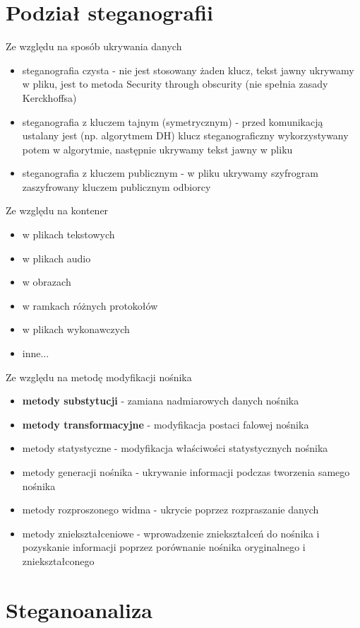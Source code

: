 \documentclass{article}
\begin{document}
\section{Podział steganografii}
Ze względu na sposób ukrywania danych
\begin{itemize}
	\item steganografia czysta - nie jest stosowany żaden klucz, tekst jawny ukrywamy w pliku, jest to metoda 	Security through obscurity (nie spełnia zasady Kerckhoffsa)
	\item steganografia z kluczem tajnym (symetrycznym) - przed komunikacją ustalany jest (np. algorytmem DH) klucz steganograficzny wykorzystywany potem w algorytmie, następnie ukrywamy tekst jawny w pliku
	\item steganografia z kluczem publicznym - w pliku ukrywamy szyfrogram zaszyfrowany kluczem publicznym
	odbiorcy
\end{itemize}
Ze względu na kontener
\begin{itemize}
	\item w plikach tekstowych
	\item w plikach audio
	\item w obrazach
	\item w ramkach różnych protokołów
	\item w plikach wykonawczych
	\item inne...
\end{itemize}
Ze względu na metodę modyfikacji nośnika
\begin{itemize}
	\item \textbf{metody substytucji} - zamiana nadmiarowych danych nośnika
	\item \textbf{metody transformacyjne} - modyfikacja postaci falowej nośnika
	\item metody statystyczne - modyfikacja właściwości statystycznych nośnika
	\item metody generacji nośnika - ukrywanie informacji podczas tworzenia samego nośnika
	\item metody rozproszonego widma - ukrycie poprzez rozpraszanie danych
	\item metody zniekształceniowe - wprowadzenie zniekształceń do nośnika i pozyskanie informacji poprzez porównanie nośnika oryginalnego i zniekształconego
\end{itemize}
\section{Steganoanaliza}
\end{document}
